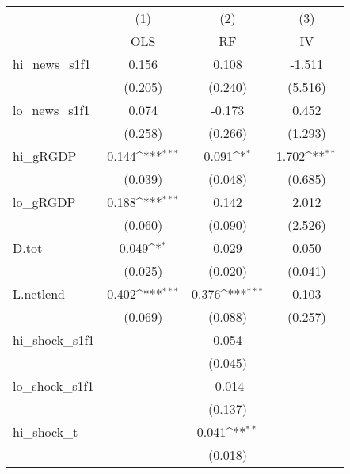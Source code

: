 {
\def\sym#1{\ifmmode^{#1}\else\(^{#1}\)\fi}
\begin{tabular}{l*{3}{c}}
\toprule
            &\multicolumn{1}{c}{(1)}&\multicolumn{1}{c}{(2)}&\multicolumn{1}{c}{(3)}\\
            &\multicolumn{1}{c}{OLS}&\multicolumn{1}{c}{RF}&\multicolumn{1}{c}{IV}\\
\midrule
hi\_news\_s1f1&       0.156         &       0.108         &      -1.511         \\
            &     (0.205)         &     (0.240)         &     (5.516)         \\
\addlinespace
lo\_news\_s1f1&       0.074         &      -0.173         &       0.452         \\
            &     (0.258)         &     (0.266)         &     (1.293)         \\
\addlinespace
hi\_gRGDP    &       0.144\sym{***}&       0.091\sym{*}  &       1.702\sym{**} \\
            &     (0.039)         &     (0.048)         &     (0.685)         \\
\addlinespace
lo\_gRGDP    &       0.188\sym{***}&       0.142         &       2.012         \\
            &     (0.060)         &     (0.090)         &     (2.526)         \\
\addlinespace
D.tot       &       0.049\sym{*}  &       0.029         &       0.050         \\
            &     (0.025)         &     (0.020)         &     (0.041)         \\
\addlinespace
L.netlend   &       0.402\sym{***}&       0.376\sym{***}&       0.103         \\
            &     (0.069)         &     (0.088)         &     (0.257)         \\
\addlinespace
hi\_shock\_s1f1&                     &       0.054         &                     \\
            &                     &     (0.045)         &                     \\
\addlinespace
lo\_shock\_s1f1&                     &      -0.014         &                     \\
            &                     &     (0.137)         &                     \\
\addlinespace
hi\_shock\_t  &                     &       0.041\sym{**} &                     \\
            &                     &     (0.018)         &                     \\

\end{tabular}}
